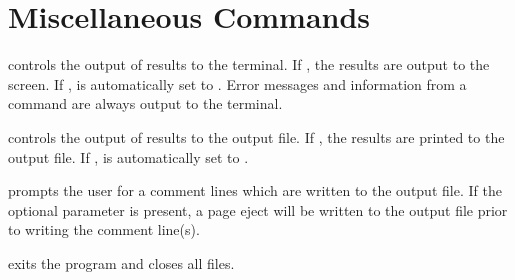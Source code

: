 \section{Miscellaneous Commands}\label{sec:misc}

 {
 controls the output of results to the terminal.  If ,
the results are output to the screen. If ,  is
automatically set to .  Error messages and information from a
 command are always output to the terminal.
}

 {
 controls the output of results to the output file.  If
, the results are printed to the output file. If ,
 is automatically set to .
}

 {
 prompts the user for a  comment lines which
are written to the output file.  If the optional parameter  is
present, a page eject will be written to the output file prior to
writing the comment line(s).
}

 {
 exits the program and closes all files.
}
